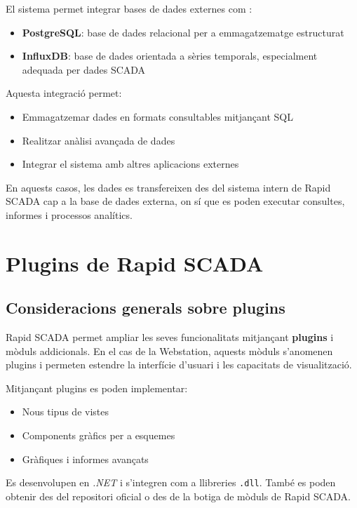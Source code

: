 \documentclass[12pt,a4paper]{report}
\begin{document}
El sistema permet integrar bases de dades externes com \cite{rapidscada_overview}:

\begin{itemize}
    \item \textbf{PostgreSQL}: base de dades relacional per a emmagatzematge estructurat
    \item \textbf{InfluxDB}: base de dades orientada a sèries temporals, especialment adequada per dades SCADA
\end{itemize}

Aquesta integració permet:
\begin{itemize}
    \item Emmagatzemar dades en formats consultables mitjançant SQL 
    \item Realitzar anàlisi avançada de dades
    \item Integrar el sistema amb altres aplicacions externes
\end{itemize}

En aquests casos, \cite{rapidscada_db_export} les dades es transfereixen des del sistema intern de Rapid SCADA cap a la base de dades externa, on sí que es poden executar consultes, informes i processos analítics.

\section{Plugins de Rapid SCADA}

\subsection{Consideracions generals sobre plugins}

Rapid SCADA permet ampliar les seves funcionalitats mitjançant \textbf{plugins} i mòduls addicionals. En el cas de la Webstation, aquests mòduls s'anomenen plugins i permeten estendre la interfície d'usuari i les capacitats de visualització.

Mitjançant plugins es poden implementar:
\begin{itemize}
    \item Nous tipus de vistes
    \item Components gràfics per a esquemes
    \item Gràfiques i informes avançats
\end{itemize}

Es desenvolupen en \textit{.NET} \cite{developers} i s'integren com a llibreries \texttt{.dll}. També es poden obtenir des del repositori oficial o des de la botiga de mòduls de Rapid SCADA.
\end{document}
